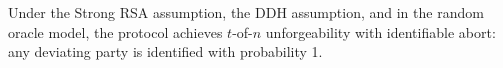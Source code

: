 \begin{theorem}
\label{thm:cggmp-security}
Under the Strong RSA assumption, the DDH assumption, and in the random oracle model, the \CGGMP{} protocol achieves $t$-of-$n$ unforgeability with identifiable abort: any deviating party is identified with probability 1.
\end{theorem}

